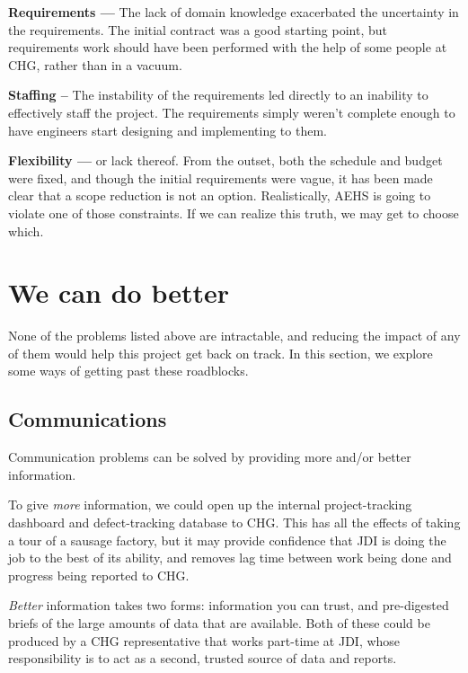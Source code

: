 \documentclass[12pt]{article}
\begin{document}
{\bf Requirements ---} The lack of domain knowledge exacerbated the uncertainty in the requirements.
The initial contract was a good starting point, but requirements work should have been performed
with the help of some people at CHG, rather than in a vacuum.
\todo{}

{\bf Staffing --} The instability of the requirements led directly to an inability to effectively
staff the project.  The requirements simply weren't complete enough to have engineers start
designing and implementing to them.
\todo{}

{\bf Flexibility ---} or lack thereof.  From the outset, both the schedule and budget were fixed, and
though the initial requirements were vague, it has been made clear that a scope reduction is not an
option.  Realistically, AEHS is going to violate one of those constraints.  If we can realize this
truth, we may get to choose which.
\todo{}

\clearpage


\section{We can do better}

None of the problems listed above are intractable, and reducing the impact of any of them would help
this project get back on track.  In this section, we explore some ways of getting past these
roadblocks.

\subsection{Communications}
Communication problems can be solved by providing more and/or better information.

To give \textit{more} information, we could open up the internal project-tracking dashboard and
defect-tracking database to CHG.  This has all the effects of taking a tour of a sausage factory,
but it may provide confidence that JDI is doing the job to the best of its ability, and removes lag
time between work being done and progress being reported to CHG.

\textit{Better} information takes two forms: information you can trust, and pre-digested briefs of
the large amounts of data that are available.  Both of these could be produced by a CHG
representative that works part-time at JDI, whose responsibility is to act as a second, trusted
source of data and reports.  \todo{}
\end{document}
